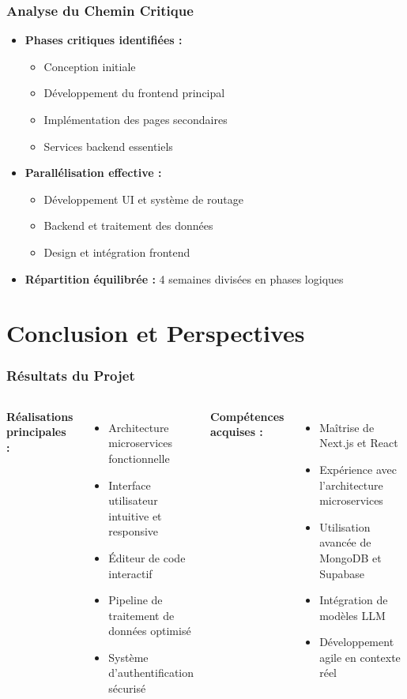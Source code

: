 \documentclass{beamer}
\begin{document}
\begin{frame}
\frametitle{Analyse du Chemin Critique}
\begin{itemize}
    \item \textbf{Phases critiques identifiées :}
    \begin{itemize}
        \item Conception initiale
        \item Développement du frontend principal
        \item Implémentation des pages secondaires
        \item Services backend essentiels
    \end{itemize}
    \item \textbf{Parallélisation effective :}
    \begin{itemize}
        \item Développement UI et système de routage
        \item Backend et traitement des données
        \item Design et intégration frontend
    \end{itemize}
    \item \textbf{Répartition équilibrée :} 4 semaines divisées en phases logiques
\end{itemize}
\end{frame}

\section{Conclusion et Perspectives}

\begin{frame}
\frametitle{Résultats du Projet}
\begin{columns}
\textbf{Réalisations principales :}
\begin{itemize}
    \item Architecture microservices fonctionnelle
    \item Interface utilisateur intuitive et responsive
    \item Éditeur de code interactif
    \item Pipeline de traitement de données optimisé
    \item Système d'authentification sécurisé
\end{itemize}

\textbf{Compétences acquises :}
\begin{itemize}
    \item Maîtrise de Next.js et React
    \item Expérience avec l'architecture microservices
    \item Utilisation avancée de MongoDB et Supabase
    \item Intégration de modèles LLM
    \item Développement agile en contexte réel
\end{itemize}
\end{columns}
\end{frame}
\end{document}
